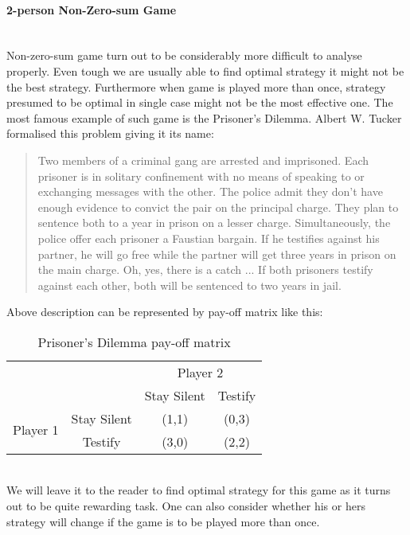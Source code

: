 \documentclass[10pt, a4paper]{report}
\begin{document}
\paragraph{2-person Non-Zero-sum Game} ~\\
Non-zero-sum game turn out to be considerably more difficult to analyse properly. Even tough we are usually able to find optimal strategy it might not be the best strategy. Furthermore when game is played more than once, strategy presumed to be optimal in single case might not be the most effective one. The most famous example of such game is the Prisoner's Dilemma. Albert W. Tucker formalised this problem giving it its name:
\begin{quotation}
    Two members of a criminal gang are arrested and imprisoned. Each prisoner is in solitary confinement with no means of speaking to or exchanging messages with the other. The police admit they don't have enough evidence to convict the pair on the principal charge. They plan to sentence both to a year in prison on a lesser charge. Simultaneously, the police offer each prisoner a Faustian bargain. If he testifies against his partner, he will go free while the partner will get three years in prison on the main charge. Oh, yes, there is a catch ... If both prisoners testify against each other, both will be sentenced to two years in jail.
\end{quotation}
Above description can be represented by pay-off matrix like this:
\begin{table}[ht!]
	\hspace{-2em}
	\centering
	\begin{tabular}{cccc|}
		& & \multicolumn{2}{c}{Player 2}                                              \\ \cline{3-4}
		& & Stay Silent &  \multicolumn{1}{c}{Testify}                                \\ \cline{3-4}
		\multirow{2}{*}{Player 1} & \multicolumn{1}{|c|}{Stay Silent} & (1,1) & (0,3) \\
		& \multicolumn{1}{|c|}{Testify} & (3,0) & (2,2)                               \\ \cline{3-4}
	\end{tabular}
	\caption{Prisoner's Dilemma pay-off matrix}
\end{table}
\\
We will leave it to the reader to find optimal strategy for this game as it turns out to be quite rewarding task. One can also consider whether his or hers strategy will change if the game is to be played more than once.
\end{document}
